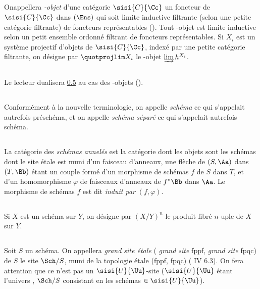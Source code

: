 \documentclass[10pt]{../fichiers-configuration-latex/smfart}
\begin{document}
\subsection{}
On\pageoriginale appellera \emph{\ppro-objet} d'une catégorie $\sisi{C}{\Cc}$ un
foncteur de $\sisi{C}{\Cc}$
dans $(\Ens)$ qui soit limite inductive filtrante (selon une petite
catégorie filtrante) de foncteurs représentables (\cf {}). Tout
\ppro-objet est limite inductive selon un petit ensemble ordonné
filtrant de foncteurs représentables. Si $X_{i}$ est un système
projectif d'objets de $\sisi{C}{\Cc}$, indexé par une petite catégorie filtrante,
on désigne par $\quotprojlim X_{i}$ le \ppro-objet $\varinjlim
h^{X_i}$.

\subsection{}
Le lecteur dualisera \hyperref[XVII.subsec0.5]{0.5} au cas des \iind-objets (\Cf {}).

\subsection{}
Conformément à la nouvelle terminologie, on appelle \emph{schéma} ce
qui s'appelait autrefois préschéma, et on appelle \emph{schéma séparé}
ce qui s'appelait autrefois schéma.

\subsection{}
La catégorie des \emph{schémas annelés} est la catégorie dont les
objets sont les schémas dont le site étale est muni d'un faisceau
d'anneaux, une flèche de $(S,\Aa)$ dans $(T,\Bb)$
étant un couple formé d'un morphisme de schémas $f$ de $S$ dans $T$,
et d'un homomorphisme $\varphi$ de faisceaux d'anneaux de
$f^{\ast}\Bb$ dans $\Aa$. Le morphisme de schémas $f$
est dit \emph{induit par} $(f,\varphi)$.

\subsection{}
Si $X$ est un schéma sur $Y$, on désigne par $(X/Y)^n$ le produit
fibré $n$-uple de $X$ sur $Y$.

\subsection{}
Soit $S$ un schéma. On appellera \emph{grand site étale} (\resp
\emph{grand site} fppf, \resp \emph{grand site} fpqc) de $S$ le site
$\Sch/{S}$, muni de la topologie étale (\resp fppf, \resp fpqc)
( IV 6.3). On fera attention que ce n'est pas un $\sisi{U}{\Uu}$-site ($\sisi{U}{\Uu}$
étant l'univers , $\Sch/{S}$ consistant en les schémas $\in
\sisi{U}{\Uu}$).
\end{document}
